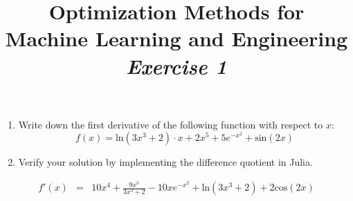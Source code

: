 
\usepackage{color} 



\author{}
\date{}
\title{Optimization Methods for \\Machine Learning and Engineering\\\vspace{0.5cm}\textit{Exercise 1}}
\maketitle


\setcounter{section}{1}
\setcounter{exercise}{0}



\begin{exercise}[ID=one,subtitle={Paper + Jupyter Notebook}]
\begin{enumerate}[label=\emph{\alph*)}]
\item Write down the first derivative of the following function with respect to $x$:
\begin{equation*}
f(x) = \mathrm{ln}(3x^3 + 2)\cdot x + 2 x^5 + 5 e^{-x^2} + \mathrm{sin}(2x)
\end{equation*}
\item Verify your solution by implementing the difference quotient in Julia.
\end{enumerate}
\end{exercise}

\begin{solution}[print=true]
\begin{eqnarray*}
f'(x) &=& 10 x^4+\frac{9x^3}{3x^3 + 2} - 10xe^{-x^2} + \mathrm{ln}(3x^3+2)+2\mathrm{cos}(2x)\\
\end{eqnarray*}
\end{solution}


